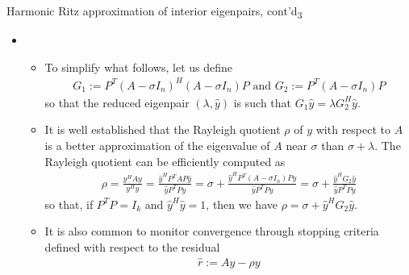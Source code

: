 \documentclass[t,usepdftitle=false]{beamer}
\begin{document}
\begin{frame}{Harmonic Ritz approximation of interior eigenpairs, cont'd\textsubscript{3}}
	\begin{itemize}
	\item[]
	\begin{itemize}\normalsize
	\item To simplify what follows, let us define
	\begin{align*}
		G_1:=P^T(A-\sigma I_n)^H(A-\sigma I_n)P
		\text{ and }
		G_2:=P^T(A-\sigma I_n)P
	\end{align*}
	so that the reduced eigenpair $(\lambda,\hat{y})$ is such that $G_1\hat{y}=\lambda G_2^H\hat{y}$.
	\item It is well established that the Rayleigh quotient $\rho$ of $y$ with respect to $A$ is a better approximation of the eigenvalue of $A$ near $\sigma$ than $\sigma+\lambda$. The Rayleigh quotient can be efficiently computed as
	\begin{align*}
		\rho=\frac{y^HAy}{y^Hy}=\frac{\hat{y}^HP^TAP\hat{y}}{\hat{y}P^TPy}
		=\sigma+\frac{\hat{y}^HP^T(A-\sigma I_n)P\hat{y}}{\hat{y}P^TPy}
		=\sigma+\frac{\hat{y}^HG_2\hat{y}}{\hat{y}P^TPy}
	\end{align*}
	so that, if $P^TP=I_k$ and $\hat{y}^H\hat{y}=1$, then we have $\boxed{\rho=\sigma+\hat{y}^HG_2\hat{y}}$.
	\item It is also common to monitor convergence through stopping criteria defined with respect to the residual
	\begin{align*}
		\hat{r}:=Ay-\rho y
	\end{align*}
	\end{itemize}
	\end{itemize}
\end{frame}
\end{document}
